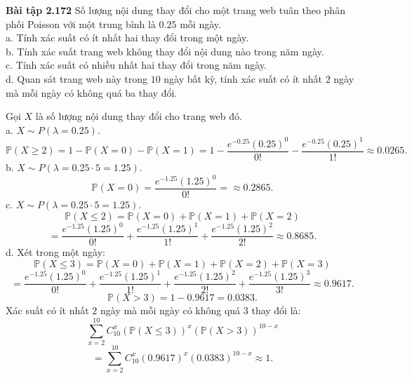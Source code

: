 \documentclass[12pt,a4paper]{article}
\begin{document}
\begin{mybox}
\textbf{Bài tập 2.172} Số lượng nội dung thay đổi cho một trang web tuân theo phân phối Poisson với một trung bình là $0.25$ mỗi ngày.\\
a. Tính xác suất có ít nhất hai thay đổi trong một ngày.\\
b. Tính xác suất trang web không thay đổi nội dung nào trong năm ngày.\\
c. Tính xác suất có nhiều nhất hai thay đổi trong năm ngày.\\
d. Quan sát trang web này trong $10$ ngày bất kỳ, tính xác suất có ít nhất $2$ ngày mà mỗi ngày có không quá ba thay đổi.
\end{mybox}
Gọi $X$ là số lượng nội dung thay đổi cho trang web đó.\\
a. $X \sim P \left( {\lambda = 0.25} \right).$
$$\mathbb{P} \left( {X \geqslant 2} \right) = 1 - \mathbb{P} \left( {X = 0} \right) - \mathbb{P} \left( {X = 1} \right) = 1 - \frac{e^{-0.25} \left( {0.25} \right)^0}{0!} - \frac{e^{-0.25} \left( {0.25} \right)^1}{1!} \approx 0.0265.$$
b. $X \sim P \left( {\lambda = 0.25 \cdot 5 = 1.25} \right).$
$$\mathbb{P} \left( {X = 0} \right) = \frac{e^{-1.25} \left( {1.25} \right)^0}{0!} = \approx 0.2865.$$
c. $X \sim P \left( {\lambda = 0.25 \cdot 5 = 1.25} \right).$
$$\mathbb{P} \left( {X \leqslant 2} \right) = \mathbb{P} \left( {X = 0} \right) + \mathbb{P} \left( {X = 1} \right) + \mathbb{P} \left( {X = 2} \right)$$ 
$$= \frac{e^{-1.25} \left( {1.25} \right)^0}{0!} + \frac{e^{-1.25} \left( {1.25} \right)^1}{1!} + \frac{e^{-1.25} \left( {1.25} \right)^2}{2!} \approx 0.8685.$$
d. Xét trong một ngày:
$$\mathbb{P} \left( {X \leqslant 3} \right) = \mathbb{P} \left( {X = 0} \right) + \mathbb{P} \left( {X = 1} \right) + \mathbb{P} \left( {X = 2} \right) + \mathbb{P} \left( {X = 3} \right)$$ 
$$= \frac{e^{-1.25} \left( {1.25} \right)^0}{0!} + \frac{e^{-1.25} \left( {1.25} \right)^1}{1!} + \frac{e^{-1.25} \left( {1.25} \right)^2}{2!} + \frac{e^{-1.25} \left( {1.25} \right)^3}{3!} \approx 0.9617.$$
$$\mathbb{P} \left( {X > 3} \right) = 1 - 0.9617 = 0.0383.$$
Xác suất có ít nhất $2$ ngày mà mỗi ngày có không quá $3$ thay đổi là:
$$\sum\limits_{x = 2}^{10}{C^x_{10} \left( { \mathbb{P} \left( {X \leqslant 3} \right) } \right)^x \left( { \mathbb{P} \left( {X > 3} \right) } \right)^{10 - x}}$$
$$ = \sum\limits_{x = 2}^{10}{C^x_{10} \left( { 0.9617} \right)^x \left( { 0.0383 } \right)^{10 - x}} \approx 1.$$ 
\end{document}
